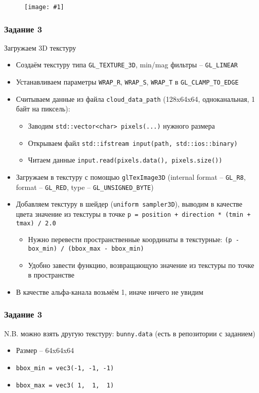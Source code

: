 \documentclass{beamer}
\newcommand{\slideimage}[1]{
  \begin{figure}
    \begin{adjustbox}{width=\textwidth, totalheight=\textheight-2\baselineskip-2\baselineskip,keepaspectratio}
      \texttt{[image: \#1]}
    \end{adjustbox}
  \end{figure}
}
\begin{document}
\begin{frame}[fragile]
\slideimage{2.png}
\end{frame}

\begin{frame}[fragile]
\frametitle{Задание 3}
\fontsize{8pt}{8pt}\selectfont
Загружаем 3D текстуру
\begin{itemize}
\item Создаём текстуру типа \verb|GL_TEXTURE_3D|, min/mag фильтры -- \verb|GL_LINEAR|
\item Устанавливаем параметры \verb|WRAP_R|, \verb|WRAP_S|, \verb|WRAP_T| в \verb|GL_CLAMP_TO_EDGE|
\item Считываем данные из файла \verb|cloud_data_path| (128x64x64, одноканальная, 1 байт на пиксель):
\begin{itemize}
\fontsize{8pt}{8pt}\selectfont
\item Заводим \verb|std::vector<char> pixels(...)| нужного размера
\item Открываем файл \verb|std::ifstream input(path, std::ios::binary)|
\item Читаем данные \verb|input.read(pixels.data(), pixels.size())|
\end{itemize}
\item Загружаем в текстуру с помощью \verb|glTexImage3D| (internal format -- \verb|GL_R8|, format -- \verb|GL_RED|, type -- \verb|GL_UNSIGNED_BYTE|)
\item Добавляем текстуру в шейдер (\verb|uniform sampler3D|), выводим в качестве цвета значение из текстуры в точке \verb|p = position + direction * (tmin + tmax) / 2.0|
\begin{itemize}
\fontsize{8pt}{8pt}\selectfont
\item Нужно перевести пространственные координаты в текстурные: \verb|(p - box_min) / (bbox_max - bbox_min)|
\item Удобно завести функцию, возвращающую значение из текстуры по точке в пространстве
\end{itemize}
\item В качестве альфа-канала возьмём 1, иначе ничего не увидим
\end{itemize}
\end{frame}

\begin{frame}[fragile]
\frametitle{Задание 3}
N.B. можно взять другую текстуру: \verb|bunny.data| (есть в репозитории с заданием)
\begin{itemize}
\item Размер -- 64x64x64
\item \verb|bbox_min = vec3(-1, -1, -1)|
\item \verb|bbox_max = vec3( 1,  1,  1)|
\end{itemize}
\end{frame}
\end{document}
